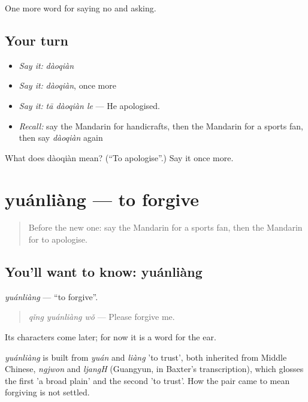 \begin{grammarlens}[title={What you've built}]
One more word for saying no and asking.
\end{grammarlens}

\subsection*{Your turn}
\begin{itemize}
\raggedright
  \item \emph{Say it:} \emph{dàoqiàn}
  \item \emph{Say it:} \emph{dàoqiàn}, once more
  \item \emph{Say it:} \emph{tā dàoqiàn le} — He apologised.
  \item \emph{Recall:} say the Mandarin for handicrafts, then the Mandarin for a sports fan, then say \emph{dàoqiàn} again
\end{itemize}

\begin{tcolorbox}[breakable,colback=teal!4,colframe=teal!35!black,title={Before you move on}]
What does dàoqiàn mean? (\textquotedblleft{}To apologise\textquotedblright{}.) Say it once more.
\end{tcolorbox}
\section[yuánliàng]{yuánliàng — to forgive}

\label{lesson:ZH-C275-yuanliang}



\begin{quote}
Before the new one: say the Mandarin for a sports fan, then the Mandarin for to apologise.
\end{quote}

\subsection*{You'll want to know: yuánliàng}
\emph{yuánliàng} — \textquotedblleft{}to forgive\textquotedblright{}.

\begin{quote}
\emph{qǐng yuánliàng wǒ} — Please forgive me.
\end{quote}

Its characters come later; for now it is a word for the ear.

\begin{cousinweb}
\emph{yuánliàng} is built from \emph{yuán} and \emph{liàng} 'to trust', both inherited from Middle Chinese, \emph{ngjwon} and \emph{ljangH} (Guangyun, in Baxter's transcription), which glosses the first 'a broad plain' and the second 'to trust'. How the pair came to mean forgiving is not settled.
\end{cousinweb}

